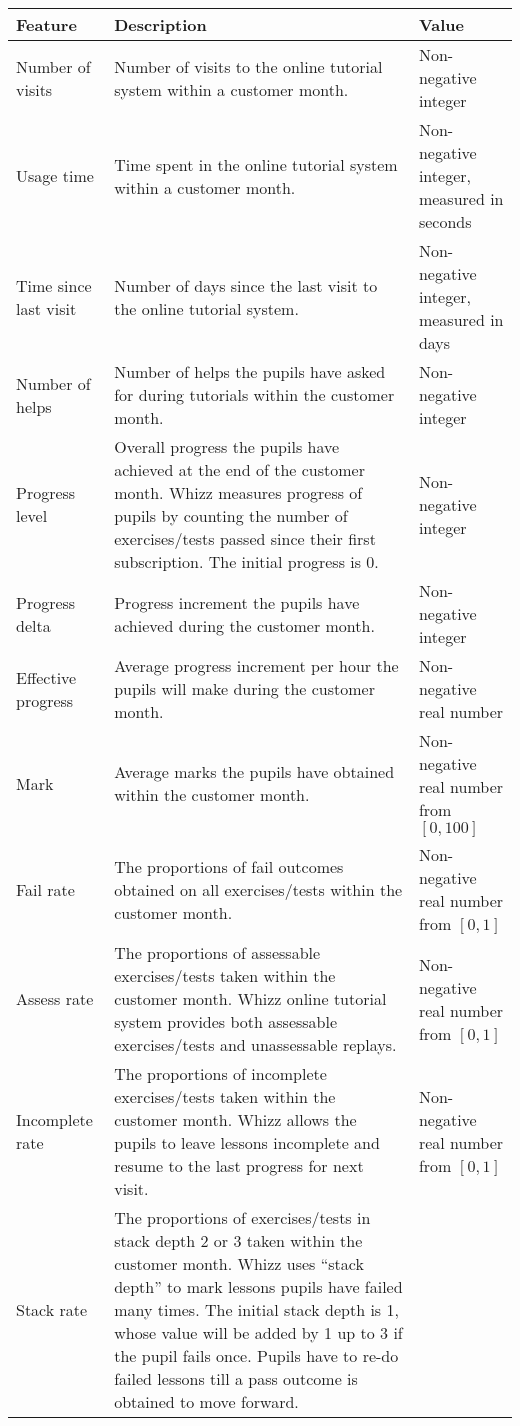 \begin{table}[!h]
\centering
\footnotesize
\begin{tabular}{p{3cm}|p{7cm}|p{3.3cm}}
\hline
\textbf{Feature} & \textbf{Description} & \textbf{Value} \\
\hline
Number of visits &
Number of visits to the online tutorial system within a customer month. &
Non-negative integer \\
\hline
Usage time &
Time spent in the online tutorial system within a customer month. &
Non-negative integer, measured in seconds \\
\hline
Time since last visit &
Number of days since the last visit to the online tutorial system. &
Non-negative integer, measured in days \\
\hline
Number of helps &
Number of helps the pupils have asked for during tutorials within the customer month. &
Non-negative integer \\
\hline
Progress level &
Overall progress the pupils have achieved at the end of the customer month. Whizz measures progress of pupils by counting the number of exercises/tests passed since their first subscription. The initial progress is 0. &
Non-negative integer \\
\hline
Progress delta &
Progress increment the pupils have achieved during the customer month. &
Non-negative integer \\
\hline
Effective progress &
Average progress increment per hour the pupils will make during the customer month. &
Non-negative real number \\
\hline
Mark &
Average marks the pupils have obtained within the customer month. &
Non-negative real number from $[0,100]$ \\
\hline
Fail rate &
The proportions of fail outcomes obtained on all exercises/tests within the customer month. &
Non-negative real number from $[0,1]$ \\
\hline
Assess rate &
The proportions of assessable exercises/tests taken within the customer month. Whizz online tutorial system provides both assessable exercises/tests and unassessable replays. &
Non-negative real number from $[0,1]$ \\
\hline
Incomplete rate &
The proportions of incomplete exercises/tests taken within the customer month. Whizz allows the pupils to leave lessons incomplete and resume to the last progress for next visit. &
Non-negative real number from $[0,1]$ \\
\hline
Stack rate &
The proportions of exercises/tests in stack depth 2 or 3 taken within the customer month. Whizz uses ``stack depth'' to mark lessons pupils have failed many times. The initial stack depth is 1, whose value will be added by 1 up to 3 if the pupil fails once. Pupils have to re-do failed lessons till a pass outcome is obtained to move forward. &

\end{tabular}
\end{table}
